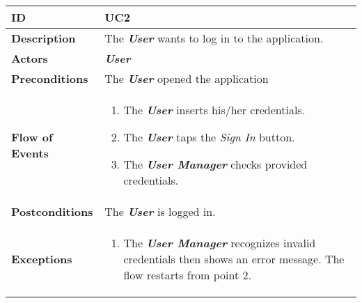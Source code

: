 \begin{tabularx}{\linewidth}{| l | X |}
	\hline
	\textbf{ID} & UC2\\
	
	\hline
	\textbf{Description} & The \textbf{\textit{User}} wants to log in to the application.\\
	
	\hline
	\textbf{Actors} & \textbf{\textit{User}}\\
	
	\hline
	\textbf{Preconditions} & The \textbf{\textit{User}} opened the application\\
	
	\hline
	\textbf{Flow of Events} & \parbox{0.7\textwidth}{\begin{enumerate}
			\item The \textbf{\textit{User}} inserts his/her credentials.
			\item The \textbf{\textit{User}} taps the \textit{Sign In} button.
			\item The \textbf{\textit{User Manager}} checks provided credentials.
	\end{enumerate}}\\
	
	\hline
	\textbf{Postconditions} & The \textbf{\textit{User}} is logged in.\\
	
	\hline
	\textbf{Exceptions} & \parbox{0.7\textwidth}{ \begin{enumerate}
			\item The \textbf{\textit{User Manager}} recognizes invalid credentials then shows an error message. The flow restarts from point 2.
	\end{enumerate}}\\
	
	\hline
	
\end{tabularx}

